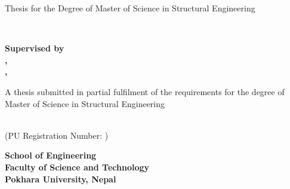 \begin{titlepage}
    \begin{center}
        
        {\fontsize{16}{20}\selectfont Thesis for the Degree of Master of Science in Structural Engineering} \\[14pt] %

        \vspace{10pt} %

        {\fontsize{20}{24}\selectfont \textbf{\myThesisTitle}} \\[42pt] %

        \vspace{10pt} %

        {\fontsize{16}{20}\selectfont \textbf{Supervised by}} \\[8pt]
        {\fontsize{14}{18}\selectfont \textbf{\mySupervisorOneName, \mySupervisorOneDesignation}} \\
        {\fontsize{14}{18}\selectfont \textbf{\mySupervisorTwoName, \mySupervisorTwoDesignation}} \\[42pt] %

        \vspace{10pt} %

        {\fontsize{16}{20}\selectfont A thesis submitted in partial fulfilment of the requirements for the degree of Master of Science in Structural Engineering} \\[28pt] %

        \vspace{10pt} %

        {\fontsize{16}{20}\selectfont \textbf{\myStudentName}} \\ %
        {\fontsize{16}{20}\selectfont (PU Registration Number: \myRegistrationNumber)} %

        \vfill %

        {\fontsize{16}{20}\selectfont \textbf{School of Engineering}} \\ %
        {\fontsize{16}{20}\selectfont \textbf{Faculty of Science and Technology}} \\ %
        {\fontsize{16}{20}\selectfont \textbf{Pokhara University, Nepal}} \\[14pt] %

        \vspace{10pt} %

        {\fontsize{16}{20}\selectfont \textbf{\mySubmissionDate}} %

    \end{center}
\end{titlepage}